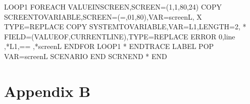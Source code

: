 \documentclass[letterpaper,10pt,english]{sphinxmanual}
\begin{document}
\begin{sphinxVerbatim}[commandchars=\\\{\}]
LOOP1    FOREACH\PYGZdl{} VALUE\PYGZhy{}IN\PYGZhy{}SCREEN,SCREEN=(1,1,80,24)
   COPY\PYGZdl{} SCREEN\PYGZhy{}TO\PYGZhy{}VARIABLE,SCREEN=(=,01,80),VAR=\PYGZsq{}screenL\PYGZsq{},      X
         TYPE=REPLACE
   COPY\PYGZdl{} SYSTEM\PYGZhy{}TO\PYGZhy{}VARIABLE,VAR=\PYGZsq{}L1\PYGZsq{},LENGTH=2,                   *
         FIELD=(VALUE\PYGZhy{}OF,CURRENT\PYGZhy{}LINE),TYPE=REPLACE
   ERROR\PYGZdl{} 0,\PYGZsq{}line \PYGZsq{},\PYGZsq{}*L1\PYGZsq{},\PYGZsq{}== \PYGZsq{},\PYGZsq{}*screenL\PYGZsq{}
   ENDFOR\PYGZdl{} LOOP1
*
ENDTRACE LABEL\PYGZdl{}
   POP\PYGZdl{} VAR=\PYGZsq{}screenL\PYGZsq{}
   SCENARIO END
   SCRNEND
*
   END
\end{sphinxVerbatim}


\chapter{Appendix B}
\label{\detokenize{TN201904:appendix-b}}
\end{document}
